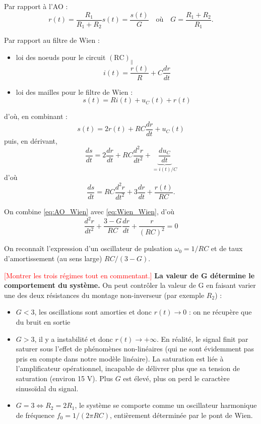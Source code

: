 \documentclass[11pt,a4paper]{report}
\begin{document}
Par rapport à l'AO :
\begin{equation}
	\boxed{r(t) = \frac{R_1}{R_1 + R_2}s(t) = \frac{s(t)}{G} \quad\text{où}\quad G = \frac{R_1 + R_2}{R_1}.}
	\label{eq:AO_Wien}
\end{equation}

Par rapport au filtre de Wien :
\begin{itemize}
	\item loi des noeuds pour le circuit $(\text{RC})_\parallel$ 
		\begin{equation}
			i(t) = \frac{r(t)}{R} + C\frac{dr}{dt}
		\end{equation}
	
	\item loi des mailles pour le filtre de Wien :
		\begin{equation}
			s(t) = Ri(t) + u_C(t) + r(t)
		\end{equation}
\end{itemize}
d'où, en combinant :
\begin{equation}
	s(t) = 2 r(t) + RC \frac{dr}{dt} + u_C(t)
\end{equation}
puis, en dérivant,
\begin{equation}
	\frac{ds}{dt} = 2\frac{dr}{dt} + RC\frac{d^2r}{dt^2} + \underbrace{\frac{du_C}{dt}}_{= i(t)/C} 
\end{equation}
d'où
\begin{equation}
	\boxed{\frac{ds}{dt} = RC\frac{d^2 r}{dt^2} + 3 \frac{dr}{dt} + \frac{r(t)}{RC}}.
	\label{eq:Wien_Wien}
\end{equation}

On combine \eqref{eq:AO_Wien} avec \eqref{eq:Wien_Wien}, d'où
\begin{equation}
	\boxed{\frac{d^2r}{dt^2} + \frac{3-G}{RC}\frac{dr}{dt} + \frac{r}{(RC)^2} = 0}
\end{equation}

On reconnaît l'expression d'un oscillateur de pulsation $\omega_0 = {1}/{RC}$ et de taux d'amortissement (au sens large) $RC/(3-G)$.

\textcolor{red}{[Montrer les trois régimes tout en commentant.]}
\textbf{La valeur de G détermine le comportement du système.} On peut contrôler la valeur de G en faisant varier une des deux résistances du montage non-inverseur (par exemple $R_2$) :
\begin{itemize}
	\item $G < 3$, les oscillations sont amorties et donc $r(t) \rightarrow 0$ : on ne récupère que du bruit en sortie
	\item $G > 3$, il y a instabilité et donc $r(t) \rightarrow +\infty$. En réalité, le signal finit par saturer sous l'effet de phénomènes non-linéaires (qui ne sont évidemment pas pris en compte dans notre modèle linéaire). La saturation est liée à l'amplificateur opérationnel, incapable de délivrer plus que sa tension de saturation (environ 15 V). Plus $G$ est élevé, plus on perd le caractère sinusoïdal du signal.
	\item $G = 3 \Leftrightarrow R_2 = 2R_1$, le système se comporte comme un oscillateur harmonique de fréquence $f_0 = 1/(2\pi RC)$, entièrement déterminée par le pont de Wien. 
\end{itemize}
\end{document}
